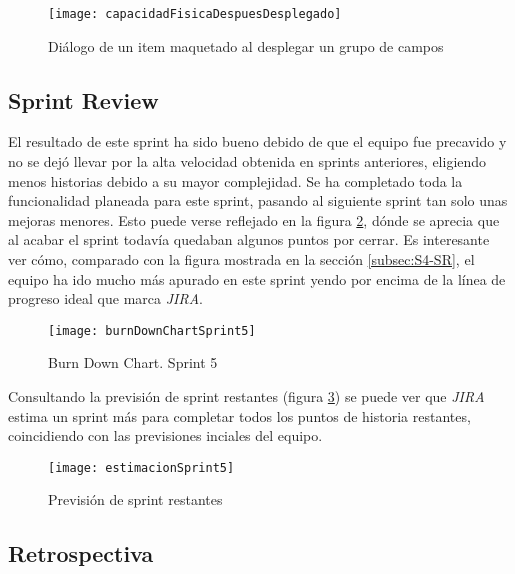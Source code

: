 \begin{figure}[!h]
\begin{center}
\texttt{[image: capacidadFisicaDespuesDesplegado]}
\caption{Diálogo de un item maquetado al desplegar un grupo de campos}
\label{fig:capacidadFisicaDespuesDesplegado}
\end{center}
\end{figure}

\subsection{Sprint Review}
\label{subsec:S5-SR}

El resultado de este sprint ha sido bueno debido de que el equipo fue precavido y no se dejó llevar por la alta velocidad obtenida en sprints anteriores, eligiendo menos historias debido a su mayor complejidad. Se ha completado toda la funcionalidad planeada para este sprint, pasando al siguiente sprint tan solo unas mejoras menores. Esto puede verse reflejado en la figura \ref{fig:burnDownChartSprint5}, dónde se aprecia que al acabar el sprint todavía quedaban algunos puntos por cerrar. Es interesante ver cómo, comparado con la figura mostrada en la sección \ref{subsec:S4-SR}, el equipo ha ido mucho más apurado en este sprint yendo por encima de la línea de progreso ideal que marca \emph{JIRA}.

\begin{figure}[!h]
\begin{center}
\texttt{[image: burnDownChartSprint5]}
\caption{Burn Down Chart. Sprint 5}
\label{fig:burnDownChartSprint5}
\end{center}
\end{figure}

Consultando la previsión de sprint restantes (figura \ref{fig:estimacionSprint5}) se puede ver que \emph{JIRA} estima un sprint más para completar todos los puntos de historia restantes, coincidiendo con las previsiones inciales del equipo.

\begin{figure}[!h]
\begin{center}
\texttt{[image: estimacionSprint5]}
\caption{Previsión de sprint restantes}
\label{fig:estimacionSprint5}
\end{center}
\end{figure}

\subsection{Retrospectiva}
\label{subsec:S5-Retrospectiva}

